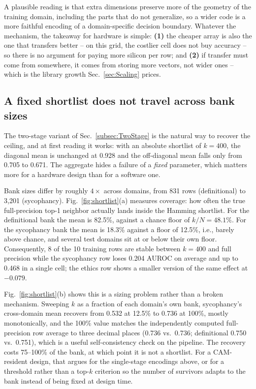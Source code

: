 \documentclass[conference]{IEEEtran}
\newcommand{\cam}{{CAM}\xspace}
\newcommand{\auroc}{{AUROC}\xspace}
\begin{document}
A plausible reading is that extra dimensions preserve more of the
geometry of the training domain, including the parts that do not
generalize, so a wider code is a more faithful encoding of a
domain-specific decision boundary. Whatever the mechanism, the
takeaway for hardware is simple: {\bf (1)} the cheaper array is also
the one that transfers better -- on this grid, the costlier cell does
not buy accuracy -- so there is no argument for
paying more silicon per row; and {\bf (2)} if transfer must come from
somewhere, it comes from storing more vectors, not wider ones --
which is the library growth Sec.~\ref{sec:Scaling} prices.

\subsection{A fixed shortlist does not travel across bank sizes}
\label{subsec:Shortlist}
The two-stage variant of Sec.~\ref{subsec:TwoStage} is the natural way
to recover the ceiling, and at first reading it works: with an absolute
shortlist of $k=400$, the diagonal mean is unchanged at 0.928 and the
off-diagonal mean falls only from 0.705 to 0.671. The aggregate hides a
failure of a \emph{fixed} parameter, which matters more for a hardware
design than for a software one.

Bank sizes differ by roughly $4\times$ across domains, from 831 rows
(definitional) to 3{,}201 (sycophancy). Fig.~\ref{fig:shortlist}(a)
measures coverage: how often the true full-precision top-1 neighbor
actually lands inside the Hamming shortlist. For the definitional bank
the mean is 82.5\%, against a chance floor of $k/N = 48.1\%$. For the
sycophancy bank the mean is 18.3\% against a floor of 12.5\%, i.e.,
barely above chance, and several test domains sit at or below their own
floor. Consequently, 8 of the 10 training rows are stable between $k=400$
and full precision while the sycophancy row loses 0.204 \auroc on
average and up to 0.468 in a single cell; the ethics row shows a smaller
version of the same effect at $-0.079$.

Fig.~\ref{fig:shortlist}(b) shows this is a sizing problem rather than a
broken mechanism. Sweeping $k$ as a fraction of each domain's own bank,
sycophancy's cross-domain mean recovers from 0.532 at 12.5\% to 0.736 at
100\%, mostly monotonically, and the 100\% value matches the
independently computed full-precision row average to three decimal places
(0.736 vs.\ 0.736; definitional 0.750 vs.\ 0.751), which is a useful
self-consistency check on the pipeline. The recovery costs 75--100\% of
the bank, at which point it is not a shortlist. For a \cam-resident
design, that argues for the single-stage encodings above, or for a
threshold rather than a top-$k$ criterion so the number of survivors
adapts to the bank instead of being fixed at design time.
\end{document}
